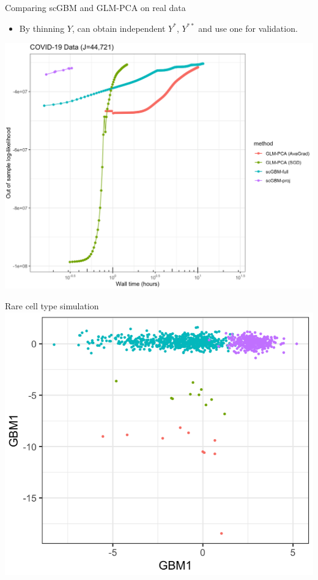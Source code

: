 \documentclass[aspectratio=43]{beamer}
\begin{document}
\begin{frame}{Comparing scGBM and GLM-PCA on real data}
\begin{itemize}
\item By thinning $Y$, can obtain independent $Y^*$, $Y^{**}$ and use one for validation.

\vspace{1em}

\end{itemize}
\centering
\includegraphics[scale=0.17]{Fig/oos_covid.png}
\end{frame}

\begin{frame}{Rare cell type simulation}
\centering
\includegraphics[scale=0.25]{Fig/single_marker_scGBM.png}
\end{frame}
\end{document}
